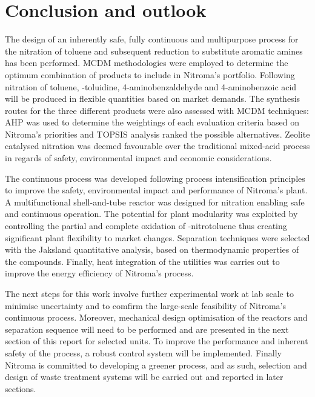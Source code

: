 \section{Conclusion and outlook}

The design of an inherently safe, fully continuous and multipurpose process for the nitration of toluene and subsequent reduction to substitute aromatic amines has been performed. MCDM methodologies were employed to determine the optimum combination of products to include in Nitroma's portfolio. Following nitration of toluene, \ortho-toluidine, 4-aminobenzaldehyde and 4-aminobenzoic acid will be produced in flexible quantities based on market demands. The synthesis routes for the three different products were also assessed with MCDM techniques: AHP was used to determine the weightings of each evaluation criteria based on Nitroma's priorities and TOPSIS analysis ranked the possible alternatives. Zeolite catalysed nitration was deemed favourable over the traditional mixed-acid process in regards of safety, environmental impact and economic considerations. 

The continuous process was developed following process intensification principles to improve the safety, environmental impact and performance of Nitroma's plant. A multifunctional shell-and-tube reactor was designed for nitration enabling safe and continuous operation. The potential for plant modularity was exploited by controlling the partial and complete oxidation of \para-nitrotoluene thus creating significant plant flexibility to market changes. Separation techniques were selected with the Jaksland quantitative analysis, based on thermodynamic properties of the compounds. Finally, heat integration of the utilities was carries out to improve the energy efficiency of Nitroma's process.

The next steps for this work involve further experimental work at lab scale to minimise uncertainty and to comfirm the large-scale feasibility of Nitroma's continuous process. Moreover, mechanical design optimisation of the reactors and separation sequence will need to be performed and are presented in the next section of this report for selected units. To improve the performance and inherent safety of the process, a robust control system will be implemented. Finally Nitroma is committed to developing a greener process, and as such, selection and design of waste treatment systems will be carried out and reported in later sections.
